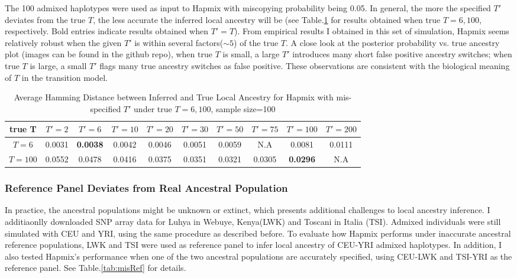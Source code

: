 \documentclass{article}
\begin{document}
The 100 admixed haplotypes were used as input to Hapmix with miscopying probability being 0.05. In general, the more the specified $T'$ deviates from the true $T$, the less accurate the inferred local ancestry will be (see Table.\ref{tab:misT} for results obtained when true $T=6,100$, respectively. Bold entries indicate results obtained when $T'=T$). From empirical results I obtained in this set of simulation, Hapmix seems relatively robust when the given $T'$ is within several factors($\sim 5$) of the true $T$. A close look at the posterior probability vs. true ancestry plot (images can be found in the github repo), when true $T$ is small, a large $T'$ introduces many short false positive ancestry switches; when true $T$ is large, a small $T'$ flags many true ancestry switches as false positive. These observations are consistent with the biological meaning of $T$ in the transition model.

\begin{table}[H]
\begin{center}
\begin{tabular}{c | c c c c c c c c c}
true T & $T'=2$ & $T'=6$ & $T'=10$ & $T'=20$ & $T'=30$ & $T'=50$ & $T'=75$ &$T'=100$ & $T'=200$ \\
\hline
$T=6$ & 0.0031 & \textbf{0.0038} & 0.0042 & 0.0046 & 0.0051 & 0.0059& N.A& 0.0081 & 0.0111\\
$T=100$ & 0.0552 & 0.0478 & 0.0416 & 0.0375 & 0.0351 & 0.0321 & 0.0305 & \textbf{0.0296} & N.A
\end{tabular}
\end{center}
\caption{Average Hamming Distance between Inferred and True Local Ancestry for Hapmix with mis-specified $T'$ under true $T=6,100$, sample size=100}
\label{tab:misT}
\end{table}


\subsubsection{Reference Panel Deviates from Real Ancestral Population}

In practice, the ancestral populations might be unknown or extinct, which presents additional challenges to local ancestry inference. I additiaonlly downloaded SNP array data for Luhya in Webuye, Kenya(LWK) and Toscani in Italia (TSI). Admixed individuals were still simulated with CEU and YRI, using the same procedure as described before. To evaluate how Hapmix performs under inaccurate ancestral reference populations, LWK and TSI were used as reference panel to infer local ancestry of CEU-YRI admixed haplotypes. In addition, I also tested Hapmix's performance when one of the two ancestral populations are accurately specified, using CEU-LWK and TSI-YRI as the reference panel. See Table.\ref{tab:misRef} for details.
\end{document}
